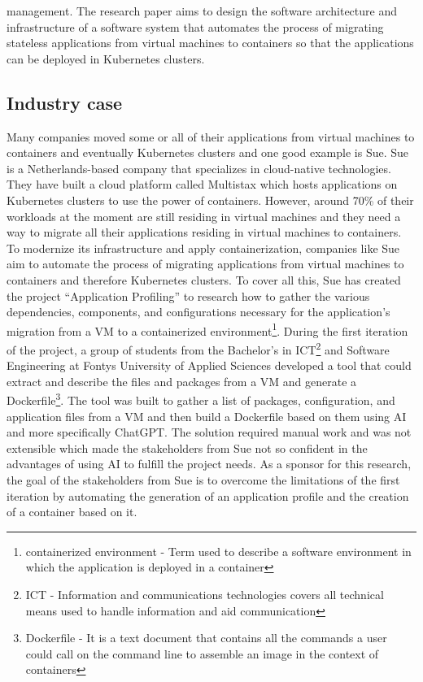 \documentclass{article}
\begin{document}
\begin{multicols}{2}
management. The research paper aims to design the software architecture and infrastructure of a software system that automates the process of migrating stateless applications from virtual machines to containers so that the applications can be deployed in Kubernetes clusters.

\subsection{Industry case}
Many companies moved some or all of their applications from virtual machines to containers and eventually Kubernetes clusters and one good example is Sue. Sue is a Netherlands-based company that specializes in cloud-native technologies. They have built a cloud platform called Multistax which hosts applications on Kubernetes clusters to use the power of containers. However, around 70\% of their workloads at the moment are still residing in virtual machines and they need a way to migrate all their applications residing in virtual machines to containers. To modernize its infrastructure and apply containerization, companies like Sue aim to automate the process of migrating applications from virtual machines to containers and therefore Kubernetes clusters. To cover all this, Sue has created the project “Application Profiling” to research how to gather the various dependencies, components, and configurations necessary for the application’s migration from a VM to a containerized environment\footnote{containerized environment - Term used to describe a software environment in which the application is deployed in a container}. During the first iteration of the project, a group of students from the Bachelor’s in ICT\footnote{ICT - Information and communications technologies covers all technical means used to handle information and aid communication} and Software Engineering at Fontys University of Applied Sciences developed a tool that could extract and describe the files and packages from a VM and generate a Dockerfile\footnote{Dockerfile - It is a text document that contains all the commands a user could call on the command line to assemble an image in the context of containers}. The tool was built to gather a list of packages, configuration, and application files from a VM and then build a Dockerfile based on them using AI and more specifically ChatGPT. The solution required manual work and was not extensible which made the stakeholders from Sue not so confident in the advantages of using AI to fulfill the project needs. As a sponsor for this research, the goal of the stakeholders from Sue is to overcome the limitations of the first iteration by automating the generation of an application profile and the creation of a container based on it.


\end{multicols}
\end{document}
